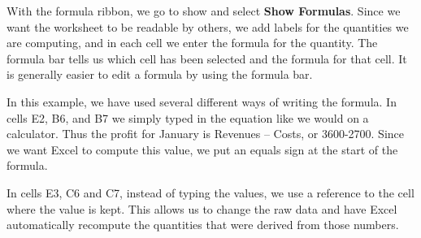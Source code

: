 \documentclass[10pt,]{book}
\newcommand{\terminology}[1]{\textbf{#1}}
\theoremstyle{plain}
\theoremstyle{definition}
\theoremstyle{definition}
\begin{document}
With the formula ribbon, we go to show and select \terminology{Show Formulas}.  Since we want the worksheet to be readable by others, we add labels for the quantities we are computing, and in each cell we enter the formula for the quantity.   The formula bar tells us which cell has been selected and the formula for that cell.   It is generally easier to edit a formula by using the formula bar.%
\par
In this example, we have used several different ways of writing the formula.  In cells E2, B6, and B7 we simply typed in the equation like we would on a calculator.  Thus the profit for January is Revenues – Costs, or 3600-2700.  Since we want Excel to compute this value, we put an equals sign at the start of the formula. %
\par
 
In cells E3, C6 and C7, instead of typing the values, we use a reference to the cell where the value is kept.  This allows us to change the raw data and have Excel automatically recompute the quantities that were derived from those numbers.%
\par
\end{document}
